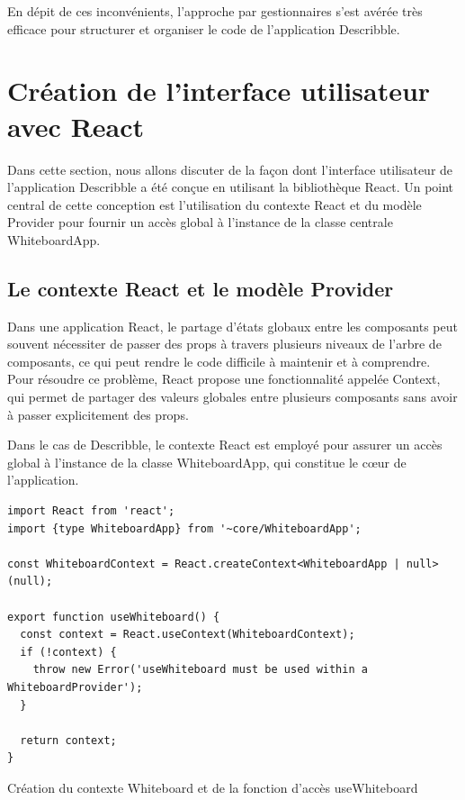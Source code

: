 En dépit de ces inconvénients, l'approche par gestionnaires s'est avérée très efficace pour structurer et organiser le code de l'application \gls{Describble}.

\section{Création de l'interface utilisateur avec React}

Dans cette section, nous allons discuter de la façon dont l'interface utilisateur de l'application \gls{Describble} a été conçue en utilisant la bibliothèque React. Un point central de cette conception est l'utilisation du contexte React et du modèle Provider pour fournir un accès global à l'instance de la classe centrale \guillemotleft WhiteboardApp\guillemotright.

\subsection{Le contexte React et le modèle Provider}

Dans une application React, le partage d'états globaux entre les composants peut souvent nécessiter de passer des props à travers plusieurs niveaux de l'arbre de composants, ce qui peut rendre le code difficile à maintenir et à comprendre. Pour résoudre ce problème, React propose une fonctionnalité appelée Context, qui permet de partager des valeurs globales entre plusieurs composants sans avoir à passer explicitement des props.

Dans le cas de \gls{Describble}, le contexte React est employé pour assurer un accès global à l'instance de la classe \guillemotleft WhiteboardApp\guillemotright, qui constitue le c\oe{}ur de l'application.

\begin{listing}[H]
    \begin{verbatim}
import React from 'react';
import {type WhiteboardApp} from '~core/WhiteboardApp';

const WhiteboardContext = React.createContext<WhiteboardApp | null>(null);

export function useWhiteboard() {
  const context = React.useContext(WhiteboardContext);
  if (!context) {
    throw new Error('useWhiteboard must be used within a WhiteboardProvider');
  }

  return context;
}
  \end{verbatim}
    \caption{Création du contexte Whiteboard et de la fonction d'accès useWhiteboard}
\end{listing}

